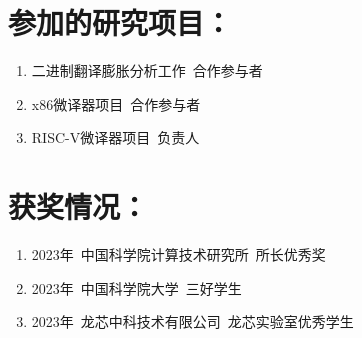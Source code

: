 \section*{参加的研究项目：}
\begin{enumerate}[nosep]
    \item 二进制翻译膨胀分析工作\ 合作参与者
    \item x86微译器项目\ 合作参与者
    \item RISC-V微译器项目\ 负责人
\end{enumerate}


\section*{获奖情况：}
\begin{enumerate}[nosep]
    \item 2023年\ 中国科学院计算技术研究所\ 所长优秀奖
    \item 2023年\ 中国科学院大学\ 三好学生
    \item 2023年\ 龙芯中科技术有限公司\ 龙芯实验室优秀学生
\end{enumerate}

\cleardoublepage[plain]%

